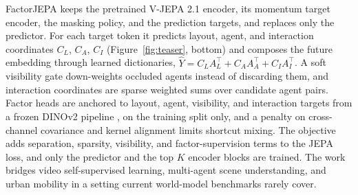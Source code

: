 \documentclass[letterpaper]{article} %
\begin{document}
FactorJEPA keeps the pretrained V-JEPA 2.1 encoder, its momentum target encoder, the masking policy, and the prediction targets, and replaces only the predictor. For each target token it predicts layout, agent, and interaction coordinates $C_L$, $C_A$, $C_I$ (Figure~\ref{fig:teaser}, bottom) and composes the future embedding through learned dictionaries, $\widehat Y = C_L A_L^{\top} + C_A A_A^{\top} + C_I A_I^{\top}$. A soft visibility gate down-weights occluded agents instead of discarding them, and interaction coordinates are sparse weighted sums over candidate agent pairs. Factor heads are anchored to layout, agent, visibility, and interaction targets from a frozen DINOv2 pipeline \cite{oquab2024dinov2}, on the training split only, and a penalty on cross-channel covariance and kernel alignment limits shortcut mixing. The objective adds separation, sparsity, visibility, and factor-supervision terms to the JEPA loss, and only the predictor and the top $K$ encoder blocks are trained. The work bridges video self-supervised learning, multi-agent scene understanding, and urban mobility in a setting current world-model benchmarks rarely cover.

{\small

}
\end{document}
